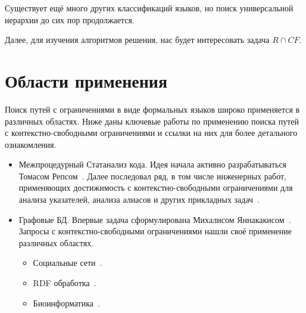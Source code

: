 Существует ещё много других классификаций языков, но поиск универсальной иерархии до сих пор продолжается.

Далее, для изучения алгоритмов решения, нас будет интересовать задача $R \cap CF$.

\section{Области применения}

Поиск путей с ограничениями в виде формальных языков широко применяется в различных областях. Ниже даны ключевые работы по применению поиска путей с контекстно-свободными ограничениями и ссылки на них для более детального ознакомления.

\begin{itemize}
    \item Межпроцедурный Статанализ кода.
    Идея начала активно разрабатываться Томасом Репсом~\cite{Reps}. Далее последовал ряд, в том числе инженерных работ, применяющих достижимость с контекстно-свободными ограничениями для анализа указателей, анализа алиасов и других прикладных задач~\cite{LabelFlowCFLReachability,specificationCFLReachability,Zheng}.
    \item Графовые БД. Впервые задача сформулирована Михалисом Яннакакисом~\cite{Yannakakis}. Запросы с контекстно-свободными ограничениями нашли своё применение различных областях.
    \begin{itemize}
        \item Социальные сети~\cite{Hellings2015PathRF}.
        \item RDF обработка~\cite{10.1007/978-3-319-46523-4_38}.
        \item Биоинформатика~\cite{cfpqBio}.
    \end{itemize}

\end{itemize}



